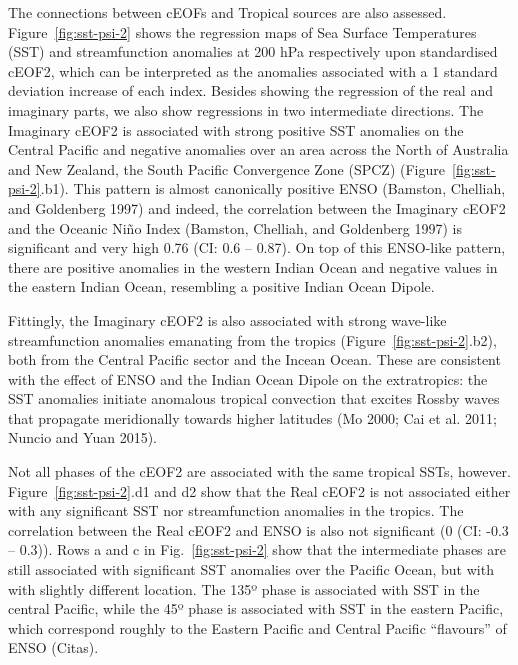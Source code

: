 \documentclass[smallextended]{svjour3}       %
\begin{document}
The connections between cEOFs and Tropical sources are also assessed.
Figure~\ref{fig:sst-psi-2} shows the regression maps of Sea Surface Temperatures (SST) and streamfunction anomalies at 200 hPa respectively upon standardised cEOF2, which can be interpreted as the anomalies associated with a 1 standard deviation increase of each index.
Besides showing the regression of the real and imaginary parts, we also show regressions in two intermediate directions.
The Imaginary cEOF2 is associated with strong positive SST anomalies on the Central Pacific and negative anomalies over an area across the North of Australia and New Zealand, the South Pacific Convergence Zone (SPCZ) (Figure~\ref{fig:sst-psi-2}.b1).
This pattern is almost canonically positive ENSO (Bamston, Chelliah, and Goldenberg 1997) and indeed, the correlation between the Imaginary cEOF2 and the Oceanic Niño Index (Bamston, Chelliah, and Goldenberg 1997) is significant and very high 0.76 (CI: 0.6 -- 0.87).
On top of this ENSO-like pattern, there are positive anomalies in the western Indian Ocean and negative values in the eastern Indian Ocean, resembling a positive Indian Ocean Dipole.

Fittingly, the Imaginary cEOF2 is also associated with strong wave-like streamfunction anomalies emanating from the tropics (Figure~\ref{fig:sst-psi-2}.b2), both from the Central Pacific sector and the Incean Ocean.
These are consistent with the effect of ENSO and the Indian Ocean Dipole on the extratropics: the SST anomalies initiate anomalous tropical convection that excites Rossby waves that propagate meridionally towards higher latitudes (Mo 2000; Cai et al. 2011; Nuncio and Yuan 2015).

Not all phases of the cEOF2 are associated with the same tropical SSTs, however. Figure~\ref{fig:sst-psi-2}.d1 and d2 show that the Real cEOF2 is not associated either with any significant SST nor streamfunction anomalies in the tropics.
The correlation between the Real cEOF2 and ENSO is also not significant (0 (CI: -0.3 -- 0.3)).
Rows a and c in Fig.~\ref{fig:sst-psi-2} show that the intermediate phases are still associated with significant SST anomalies over the Pacific Ocean, but with with slightly different location.
The 135º phase is associated with SST in the central Pacific, while the 45º phase is associated with SST in the eastern Pacific, which correspond roughly to the Eastern Pacific and Central Pacific ``flavours'' of ENSO (Citas).
\end{document}
